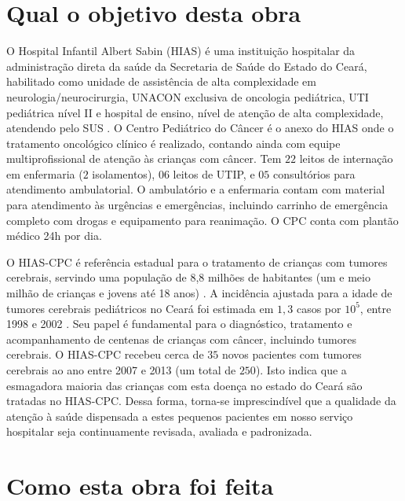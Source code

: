 \documentclass[11pt,a4paper,oldfontcommands]{memoir}
\begin{document}
\section{Qual o objetivo desta obra}

O Hospital Infantil Albert Sabin (HIAS) é uma instituição hospitalar da administração direta da saúde da Secretaria de Saúde do Estado do Ceará, habilitado como unidade de assistência de alta complexidade em neurologia/neurocirurgia, UNACON exclusiva de oncologia pediátrica, UTI pediátrica nível II e hospital de ensino, nível de atenção de alta complexidade, atendendo pelo SUS \cite{cnes}. O Centro Pediátrico do Câncer é o anexo do HIAS onde o tratamento oncológico clínico é realizado, contando ainda com equipe multiprofissional de atenção às crianças com câncer. Tem \(22\) leitos de internação em enfermaria (\(2\) isolamentos), \(06\) leitos de UTIP, e \(05\) consultórios para atendimento ambulatorial. O ambulatório e a enfermaria contam com material para atendimento às urgências e emergências, incluindo carrinho de emergência completo com drogas e equipamento para reanimação. O CPC conta com plantão médico 24h por dia.

O HIAS-CPC é referência estadual para o tratamento de crianças com tumores cerebrais, servindo uma população de 8,8 milhões de habitantes (um e meio milhão de crianças e jovens até 18 anos) \cite{estat}. A incidência ajustada para a idade de tumores cerebrais pediátricos no Ceará foi estimada em \(1,3\) casos por \(10^5\), entre 1998 e 2002 \cite{inca}. Seu papel é fundamental para o diagnóstico, tratamento e acompanhamento de centenas de crianças com câncer, incluindo tumores cerebrais. O HIAS-CPC recebeu cerca de \(35\) novos pacientes com tumores cerebrais ao ano entre 2007 e 2013 (um total de \(250\)). Isto indica que a esmagadora maioria das crianças com esta doença no estado do Ceará são tratadas no HIAS-CPC. Dessa forma, torna-se imprescindível que a qualidade da atenção à saúde dispensada a estes pequenos pacientes em nosso serviço hospitalar seja continuamente revisada, avaliada e padronizada.

\section{Como esta obra foi feita}
\end{document}
